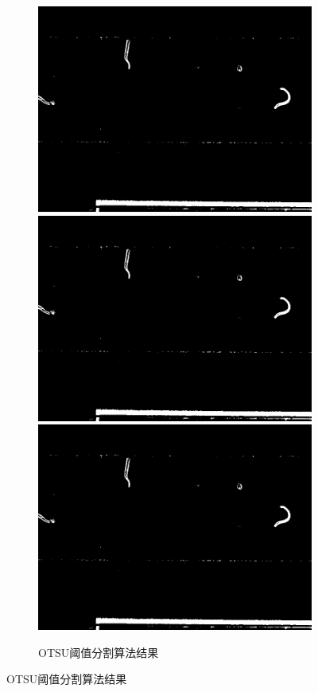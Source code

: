\begin{figure}[!htp]
	 \begin{subfigure}{\linewidth}
		\centering
		\begin{minipage}[b]{\linewidth}
		\includegraphics[width=0.33\linewidth,natwidth=800,natheight=600]{figure/chap3/test_otsu/441.orgin.1051.jpg}
		\includegraphics[width=0.33\linewidth,natwidth=800,natheight=600]{figure/chap3/test_otsu/441.orgin.1051.jpg}
		\includegraphics[width=0.33\linewidth,natwidth=800,natheight=600]{figure/chap3/test_otsu/441.orgin.1051.jpg}
		\end{minipage}
		\caption{OTSU阈值分割算法结果}
	  \end{subfigure}


\end{figure}
